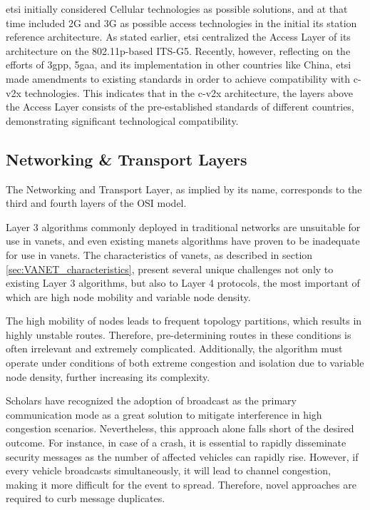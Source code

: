 \gls{etsi} initially considered Cellular technologies as possible solutions, and at that time included 2G and 3G as possible access technologies in the initial \gls{its} station reference architecture. As stated earlier, \gls{etsi} centralized the Access Layer of its architecture on the 802.11p-based ITS-G5. Recently, however, reflecting on the efforts of \gls{3gpp}, \gls{5gaa}, and \gls{its} implementation in other countries like China, \gls{etsi} made amendments to existing standards in order to achieve compatibility with \gls{c-v2x} technologies\cite{weber_c-v2x_2019}. This indicates that in the \gls{c-v2x} architecture, the layers above the Access Layer consists of the pre-established standards of different countries, demonstrating significant technological compatibility.



\subsection[Networking \& Transport Layers]{Networking \& Transport Layers}
\label{subsec:networking_transport_layers}
The Networking and Transport Layer, as implied by its name, corresponds to the third and fourth layers of the OSI model.

Layer 3 algorithms commonly deployed in traditional networks are unsuitable for use in \glspl{vanet}\cite{toor_vehicle_2008}, and even existing \glspl{manet} algorithms have proven to be inadequate for use in \glspl{vanet}\cite{liang_vehicular_2015}. The characteristics of \glspl{vanet}, as described in section \ref{sec:VANET_characteristics}, present several unique challenges not only to existing Layer 3 algorithms, but also to Layer 4 protocols, the most important of which are high node mobility and variable node density.

The high mobility of nodes leads to frequent topology partitions, which results in highly unstable routes. Therefore, pre-determining routes in these conditions is often irrelevant and extremely complicated. Additionally, the algorithm must operate under conditions of both extreme congestion and isolation due to variable node density, further increasing its complexity.

Scholars have recognized the adoption of broadcast as the primary communication mode as a great solution to mitigate interference in high congestion scenarios. Nevertheless, this approach alone falls short of the desired outcome. For instance, in case of a crash, it is essential to rapidly disseminate security messages as the number of affected vehicles can rapidly rise. However, if every vehicle broadcasts simultaneously, it will lead to channel congestion, making it more difficult for the event to spread\cite{toor_vehicle_2008}. Therefore, novel approaches are required to curb message duplicates. 

